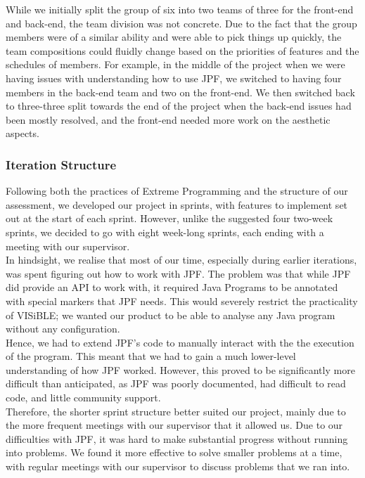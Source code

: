 \documentclass[titlepage,11pt]{article}
\begin{document}
While we initially split the group of six into two teams of three for the front-end and back-end, the team division was not concrete. Due to the fact that the group members were of a similar ability and were able to pick things up quickly, the team compositions could fluidly change based on the priorities of features and the schedules of members. For example, in the middle of the project when we were having issues with understanding how to use JPF, we switched to having four members in the back-end team and two on the front-end. We then switched back to three-three split towards the end of the project when the back-end issues had been mostly resolved, and the front-end needed more work on the aesthetic aspects.

\subsubsection{Iteration Structure}

Following both the practices of Extreme Programming and the structure of our assessment, we developed our project in sprints, with features to implement set out at the start of each sprint. However, unlike the suggested four two-week sprints, we decided to go with eight week-long sprints, each ending with a meeting with our supervisor. \\

In hindsight, we realise that most of our time, especially during earlier iterations, was spent figuring out how to work with JPF. The problem was that while JPF did provide an API to work with, it required Java Programs to be annotated with special markers that JPF needs. This would severely restrict the practicality of VISiBLE; we wanted our product to be able to analyse any Java program without any configuration. \\ 

Hence, we had to extend JPF's code to manually interact with the the execution of the program. This meant that we had to gain a much lower-level understanding of how JPF worked. However, this proved to be significantly more difficult than anticipated, as JPF was poorly documented, had difficult to read code, and little community support. \\

Therefore, the shorter sprint structure better suited our project, mainly due to the more frequent meetings with our supervisor that it allowed us. Due to our difficulties with JPF, it was hard to make substantial progress without running into problems. We found it more effective to solve smaller problems at a time, with regular meetings with our supervisor to discuss problems that we ran into.
\end{document}
